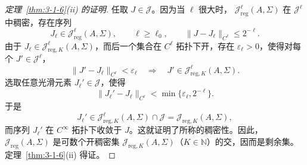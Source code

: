 \begin{proof}[定理~\ref{thm:3-1-6}\textup{(ii)} 的证明]
任取 $J\in\mathcal J$。因为当 $\ell$ 很大时，
$\mathcal J_{\mathrm{reg}}^\ell(A,\Sigma)$ 在 $\mathcal J^\ell$ 中稠密，存在序列
\[
  J_\ell\in\mathcal J_{\mathrm{reg}}^\ell(A,\Sigma),
  \qquad \ell\ge\ell_0,
  \qquad
  \|J-J_\ell\|_{C^\ell}\le2^{-\ell}.
\]
由于 $J_\ell\in\mathcal J_{\mathrm{reg},K}^\ell(A,\Sigma)$，而后一个集合在
$C^\ell$ 拓扑下开，存在 $\varepsilon_\ell>0$，使得对每个 $J'\in\mathcal J^\ell$，
\[
  \|J'-J_\ell\|_{C^\ell}<\varepsilon_\ell
  \quad\Longrightarrow\quad
  J'\in\mathcal J_{\mathrm{reg},K}^\ell(A,\Sigma).
\]
选取任意光滑元素 $J_\ell'\in\mathcal J$，使得
\[
  \|J_\ell'-J_\ell\|_{C^\ell}
  <\min\{\varepsilon_\ell,2^{-\ell}\}.
\]
于是
\[
  J_\ell'\in
  \mathcal J_{\mathrm{reg},K}^\ell(A,\Sigma)\cap\mathcal J
  =\mathcal J_{\mathrm{reg},K}(A,\Sigma),
\]
而序列 $J_\ell'$ 在 $C^\infty$ 拓扑下收敛于 $J$。这就证明了所称的稠密性。因此，
$\mathcal J_{\mathrm{reg}}(A,\Sigma)$ 是可数个开稠密集
$\mathcal J_{\mathrm{reg},K}(A,\Sigma)$（$K\in\mathbb N$）的交，因而是剩余集。
定理~\ref{thm:3-1-6}\textup{(ii)} 得证。
\end{proof}

